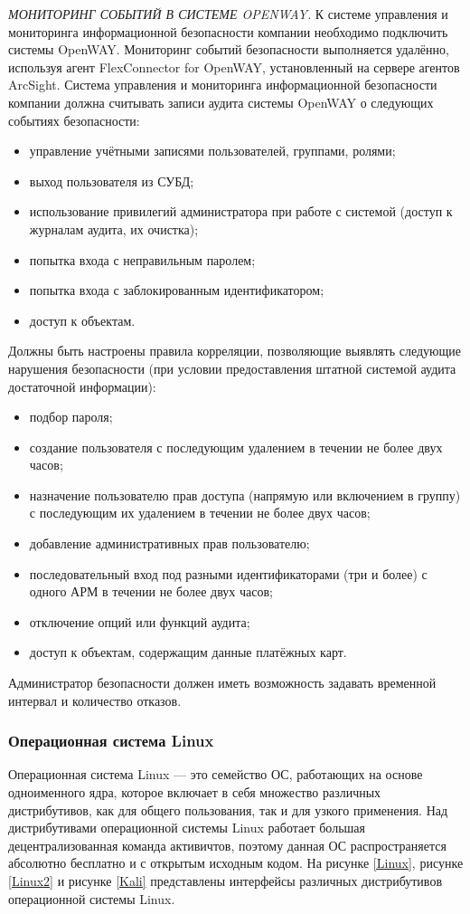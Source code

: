 \textit{МОНИТОРИНГ СОБЫТИЙ В СИСТЕМЕ OPENWAY.}
К системе управления и мониторинга информационной безопасности компании необходимо подключить системы OpenWAY. Мониторинг событий безопасности выполняется удалённо, используя агент FlexConnector for OpenWAY, установленный на сервере агентов ArcSight.
Система управления и мониторинга информационной безопасности компании должна считывать записи аудита системы OpenWAY о следующих событиях безопасности:
\begin{itemize}
    \item управление учётными записями пользователей, группами, ролями;
    \item выход пользователя из СУБД;
    \item использование привилегий администратора при работе с системой (доступ к журналам аудита, их очистка);
    \item попытка входа с неправильным паролем;
    \item попытка входа с заблокированным идентификатором;
    \item доступ к объектам.
\end{itemize}
Должны быть настроены правила корреляции, позволяющие выявлять следующие нарушения безопасности (при условии предоставления штатной системой аудита достаточной информации):
\begin{itemize}
    \item подбор пароля;
    \item создание пользователя с последующим удалением в течении не более двух часов;
    \item назначение пользователю прав доступа (напрямую или включением в группу) с последующим их удалением в течении не более двух часов;
    \item добавление административных прав пользователю;
    \item последовательный вход под разными идентификаторами (три и более) с одного АРМ в течении не более двух часов;
    \item отключение опций или функций аудита;
     \item доступ к объектам, содержащим данные платёжных карт.
\end{itemize}
Администратор безопасности должен иметь возможность задавать временной интервал и количество отказов.

\subsubsection{Операционная система Linux}
Операционная система Linux --- это семейство ОС, работающих на основе одноименного ядра, которое включает в себя множество различных дистрибутивов, как для общего пользования, так и для узкого применения. Над дистрибутивами операционной системы Linux работает большая децентрализованная команда активичтов, поэтому данная ОС распространяется абсолютно бесплатно и с открытым исходным кодом. На рисунке \ref{Linux}, рисунке \ref{Linux2} и рисунке \ref{Kali} представлены интерфейсы различных дистрибутивов операционной системы Linux.

